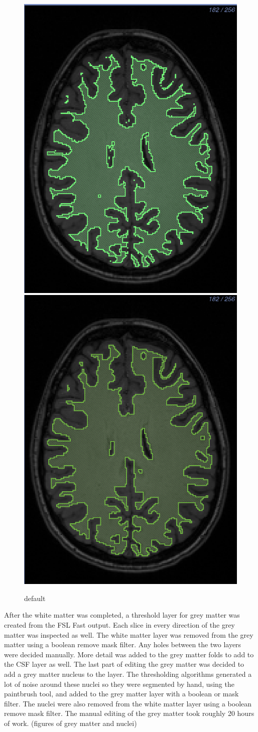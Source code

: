 \begin{figure}[H]
\begin{center}
\includegraphics[width=.49\textwidth]{Figures/whitematter_before}
\includegraphics[width=.49\textwidth]{Figures/whitematter_after}
\caption{default}
\label{default}
\end{center}
\end{figure}

After the white matter was completed, a threshold layer for grey matter was created from the FSL Fast output. Each slice in every direction of the grey matter was inspected as well. The white matter layer was removed from the grey matter using a boolean remove mask filter. Any holes between the two layers were decided manually. More detail was added to the grey matter folds to add to the CSF layer as well. The last part of editing the grey matter was decided to add a grey matter nucleus to the layer. The thresholding algorithms generated a lot of noise around these nuclei so they were segmented by hand, using the paintbrush tool, and added to the grey matter layer with a boolean or mask filter. The nuclei were also removed from the white matter layer using a boolean remove mask filter. The manual editing of the grey matter took roughly 20 hours of work. (figures of grey matter and nuclei)

